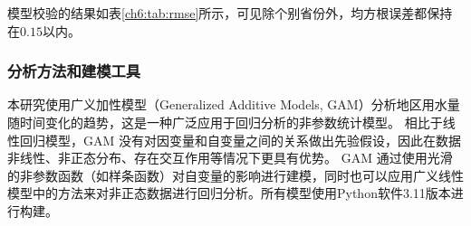 模型校验的结果如表\ref{ch6:tab:rmse}所示，可见除个别省份外，均方根误差都保持在$0.15$以内。



\subsubsection{分析方法和建模工具}

本研究使用广义加性模型（Generalized Additive Models, GAM）分析地区用水量随时间变化的趋势，这是一种广泛应用于回归分析的非参数统计模型。
相比于线性回归模型，GAM 没有对因变量和自变量之间的关系做出先验假设，因此在数据非线性、非正态分布、存在交互作用等情况下更具有优势。
GAM 通过使用光滑的非参数函数（如样条函数）对自变量的影响进行建模，同时也可以应用广义线性模型中的方法来对非正态数据进行回归分析。所有模型使用Python软件3.11版本进行构建。

% 
